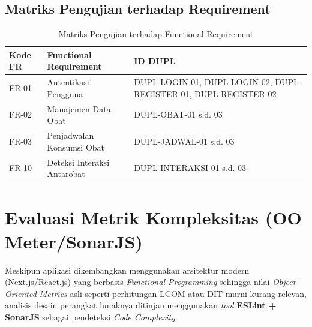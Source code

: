 \documentclass[12pt, a4paper]{article}
\begin{document}
\subsection{Matriks Pengujian terhadap Requirement}

\begin{table}[H]
  \caption{Matriks Pengujian terhadap Functional Requirement}
  \centering
  \begin{tabularx}{\textwidth}{|p{2cm}|X|X|}
    \hline
    \textbf{Kode FR} & \textbf{Functional Requirement} & \textbf{ID DUPL} \\ \hline
    FR-01 & Autentikasi Pengguna            & DUPL-LOGIN-01, DUPL-LOGIN-02, DUPL-REGISTER-01, DUPL-REGISTER-02 \\ \hline
    FR-02 & Manajemen Data Obat             & DUPL-OBAT-01 s.d. 03 \\ \hline
    FR-03 & Penjadwalan Konsumsi Obat       & DUPL-JADWAL-01 s.d. 03 \\ \hline
    FR-10 & Deteksi Interaksi Antarobat     & DUPL-INTERAKSI-01 s.d. 03 \\ \hline
  \end{tabularx}
\end{table}

\section{Evaluasi Metrik Kompleksitas (OO Meter/SonarJS)}

Meskipun aplikasi dikembangkan menggunakan arsitektur modern (Next.js/React.js) yang berbasis \textit{Functional Programming} sehingga nilai \textit{Object-Oriented Metrics} asli seperti perhitungan LCOM atau DIT murni kurang relevan, analisis desain perangkat lunaknya ditinjau menggunakan \textit{tool} \textbf{ESLint + SonarJS} sebagai pendeteksi \textit{Code Complexity}.
\end{document}
